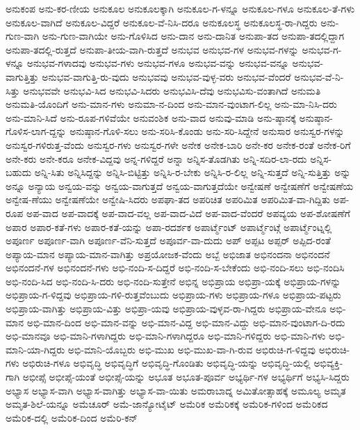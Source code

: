 {ಅನುಕಂಪ
ಅನು-ಕರ-ಣೀಯ
ಅನುಕೂಲ
ಅನುಕೂಲಕ್ಕಾಗಿ
ಅನುಕೂಲ-ಗ-ಳನ್ನೂ
ಅನುಕೂಲ-ಗಳೂ
ಅನುಕೂಲ-ತೆ-ಗಳು
ಅನುಕೂಲ-ವಾಗಿದೆ
ಅನುಕೂಲ-ವಿದ್ದರೆ
ಅನುಕೂಲ-ವೆ-ನಿಸಿ-ದರೂ
ಅನುಕೂಲಸ್ಥ
ಅನುಕೂಲಸ್ಥ-ರಾ-ಗಿದ್ದರು
ಅನು-ಗುಣ-ವಾಗಿ
ಅನು-ಗುಣ-ವಾಗಿಯೇ
ಅನು-ಗೊಳಿಸಿದ
ಅನು-ದಾನ
ಅನು-ದಾನಿತ
ಅನುಪಾ-ತದ
ಅನುಪಾ-ತದಲ್ಲಿದ್ದಾಗ
ಅನುಪಾ-ತದಲ್ಲಿ-ರುತ್ತದೆ
ಅನುಪಾ-ತೀಯ-ವಾಗಿ-ರುತ್ತದೆ
ಅನುಭವ
ಅನುಭವ-ಗಳ
ಅನುಭವ-ಗಳನ್ನು
ಅನುಭವ-ಗ-ಳನ್ನೂ
ಅನುಭವ-ಗಳಾದವು
ಅನುಭವ-ಗಳು
ಅನುಭವ-ಗಳೂ
ಅನುಭವ-ವನ್ನು
ಅನುಭವ-ವನ್ನೂ
ಅನುಭವ-ವಾಗುತ್ತಿತ್ತು
ಅನುಭವ-ವಾಗುತ್ತಿ-ರು-ವುದು
ಅನುಭವವು
ಅನುಭವ-ವುಳ್ಳ-ವರು
ಅನುಭವ-ವೆಂದರೆ
ಅನುಭವ-ವೆ-ನಿ-ಸಿತ್ತು
ಅನುಭವವೇ
ಅನುಭವಿ-ಸಿದ
ಅನುಭವಿ-ಸಿದರು
ಅನುಭವಿಸಿ-ದೆವು
ಅನುಭವಿಸು-ವಂತಾಗಿದೆ
ಅನುಮತಿ
ಅನುಮತಿ-ಯೊಂದಿಗೆ
ಅನು-ಮಾನ-ಗಳು
ಅನುಮಾ-ನ-ದಿಂದ
ಅನು-ಮಾನ-ವುಂಟಾಗ-ಲಿಲ್ಲ
ಅನು-ಮಾ-ನಿಸಿ-ದರು
ಅನು-ಮಾನಿ-ಸಿದೆ
ಅನು-ರೂಪ-ಗಳಿವೆಯೇ
ಅನುವಂಶಿಕ
ಅನು-ವಾದ
ಅನುವು-ಮಾಡಿ
ಅನು-ಷ್ಠಾನಕ್ಕೆ
ಅನುಷ್ಠಾನ-ಗೊಳಿಸ-ಲಾಗ-ದ್ದನ್ನು
ಅನುಷ್ಠಾನ-ಗೊಳಿ-ಸಲು
ಅನು-ಸರಿಸಿ-ಕೊಂಡು
ಅನು-ಸರಿ-ಸಿದ್ದೇನೆ
ಅನುಸಾರ
ಅನುಸ್ವರ-ಗಳನ್ನು
ಅನುಸ್ವರ-ಗಳಿರುತ್ತ-ವೆಂದು
ಅನುಸ್ವರ-ಗಳು
ಅನುಸ್ವರ-ಗಳೇ
ಅನೇಕ
ಅನೇಕ-ಬಾರಿ
ಅನೇ-ಕರ
ಅನೇಕ-ರಂತೆ
ಅನೇಕ-ರಿಗೆ
ಅನೇ-ಕರು
ಅನೇ-ಕರೂ
ಅನೇಕ-ವಿದ್ದವು
ಅನ್ನ-ಗಳಿದ್ದರೆ
ಅನ್ನಾ
ಅನ್ನಿಸ-ತೊಡಗಿತು
ಅನ್ನಿ-ಸದಿರ-ಲಾ-ರದು
ಅನ್ನಿಸ-ಬಹುದು
ಅನ್ನಿ-ಸಿತು
ಅನ್ನಿಸಿದ್ದನ್ನು
ಅನ್ನಿಸಿ-ಬಿಟ್ಟಿತ್ತು
ಅನ್ನಿಸಿ-ರ-ಬೇಕು
ಅನ್ನಿಸಿ-ರ-ಲಿಲ್ಲ
ಅನ್ನಿ-ಸುತ್ತದೆ
ಅನ್ನಿ-ಸುತ್ತಿತ್ತು
ಅನ್ನು
ಅನ್ನೂ
ಅನ್ಯಾಯ
ಅನ್ವಯ-ವನ್ನು
ಅನ್ವಯ-ವಾಗುತ್ತದೆ
ಅನ್ವಯ-ವಾಗುತ್ತದೆಯೇ
ಅನ್ವೇಷಣೆ
ಅನ್ವೇಷಣೆಗೆ
ಅನ್ವೇಷಣೆಯ
ಅನ್ವೇಷ-ಣೆಯು
ಅನ್ವೇಷಣೆಯೇ
ಅನ್ವೇಷಿ-ಸಿದರು
ಅಪಘಾ-ತದ
ಅಪರಿಚಿತ
ಅಪರಿಮಿತ
ಅಪರಿಮಿತ-ವಾ-ಗಿದ್ದಿತು
ಅಪ-ರೂಪ
ಅಪ-ವಾದ
ಅಪ-ವಾದಕ್ಕೆ
ಅಪ-ವಾದ-ವಲ್ಲ
ಅಪ-ವಾದ-ವಿದೆ
ಅಪ-ವಾದ-ವೆಂದರೆ
ಅಪವ್ಯಯ
ಅಪ-ಶೋಷಣೆಗೆ
ಅಪಾರ
ಅಪಾರ-ಕತೆ-ಗಳು
ಅಪಾರ-ಕತೆ-ಯನ್ನು
ಅಪಾ-ರದರ್ಶಕ
ಅಪಾರ್ಟ್ಮೆಂಟ್
ಅಪಾರ್ಟ್ಮೆಂಟ್ಗೆ
ಅಪಾರ್ಟ್ಮೆಂಟ್ನಲ್ಲಿ
ಅಪೂರ್ಣ
ಅಪೂರ್ಣ-ವಾಗಿ
ಅಪೂರ್ಣ-ವೆನಿ-ಸುತ್ತದೆ
ಅಪೂರ್ವ-ವಾ-ದುದು
ಅಪ್
ಅಪ್ಪಟ
ಅಪ್ಪರ್
ಅಪ್ಪಿದ-ರಂತೆ
ಅಪ್ಯಾಯ-ಮಾನ
ಅಪ್ಯಾಯ-ಮಾನ-ವಾಗಿತ್ತು
ಅಪ್ರಯೋಜಕ-ವೆಂದು
ಅಬ್ಬೆ
ಅಭಿಜಾತ
ಅಭಿನಂದನಾ
ಅಭಿನಂದನೆ
ಅಭಿನಂದನೆ-ಗಳ
ಅಭಿನಂದನೆ-ಗಳು
ಅಭಿ-ನಂದಿ-ಸ-ದಿದ್ದರೆ
ಅಭಿ-ನಂದಿ-ಸ-ಬೇಕೆಂದು
ಅಭಿ-ನಂದಿ-ಸಲು
ಅಭಿ-ನಂದಿಸಿ
ಅಭಿ-ನಂದಿ-ಸಿದ
ಅಭಿ-ನಂದಿ-ಸಿ-ದರು
ಅಭಿ-ನಂದಿ-ಸುತ್ತೇನೆ
ಅಭಿನ್ನ
ಅಭಿಪ್ರಾಯ
ಅಭಿಪ್ರಾ-ಯಕ್ಕೆ
ಅಭಿಪ್ರಾಯ-ಗಳನ್ನು
ಅಭಿಪ್ರಾಯ-ಗ-ಳಿದ್ದವು
ಅಭಿಪ್ರಾಯ-ಗಳಿ-ರುತ್ತವೆಂಬುದು
ಅಭಿಪ್ರಾಯ-ಗಳು
ಅಭಿಪ್ರಾಯ-ಗಳೂ
ಅಭಿಪ್ರಾಯ-ಪಟ್ಟರು
ಅಭಿಪ್ರಾಯ-ವಾಗಿತ್ತು
ಅಭಿಪ್ರಾಯ-ವಿತ್ತು
ಅಭಿಪ್ರಾ-ಯವು
ಅಭಿಪ್ರಾಯ-ವುಳ್ಳವ-ರಾ-ಗಿದ್ದರು
ಅಭಿಪ್ರಾಯ-ವೇನೂ
ಅಭಿ-ಮಾನ
ಅಭಿ-ಮಾನ-ದಿಂದ
ಅಭಿ-ಮಾನ-ವನ್ನು
ಅಭಿ-ಮಾನ-ವಿದ್ದ
ಅಭಿ-ಮಾನ-ವಿದ್ದು
ಅಭಿ-ಮಾನ-ವುಂಟಾಗ-ದಿ-ರದು
ಅಭಿ-ಮಾನವೂ
ಅಭಿ-ಮಾನಿ-ಗಳಾಗಿದ್ದರು
ಅಭಿ-ಮಾನಿ-ಗಳಾಗಿದ್ದರೂ
ಅಭಿ-ಮಾನಿ-ಗಳಿದ್ದರು
ಅಭಿ-ಮಾನಿ-ಗಳು
ಅಭಿ-ಮಾನಿ-ಯಾ-ಗಿದ್ದರು
ಅಭಿ-ಮಾನಿ-ಯೊಬ್ಬರು
ಅಭಿ-ಮುಖ
ಅಭಿ-ಮುಖ-ವಾ-ಗಿ-ರುವ
ಅಭಿರುಚಿ-ಗ-ಳಿದ್ದವು
ಅಭಿರುಚಿ-ಗಳು
ಅಭಿರುಚಿ-ಗಳೂ
ಅಭಿವೃದ್ಧಿ
ಅಭಿವೃದ್ಧಿಗೆ
ಅಭಿವೃದ್ಧಿ-ಗೊಂಡಿತು
ಅಭಿವೃದ್ಧಿ-ಯನ್ನು
ಅಭಿವೃದ್ಧಿ-ಯಲ್ಲಿ
ಅಭಿವ್ಯಕ್ತಿ-ಗಾಗಿ
ಅಭೀಪ್ಸೆ
ಅಭೀಪ್ಸೆ-ಯಂತೆ
ಅಭೀಪ್ಸೆ-ಯನ್ನು
ಅಭೂತ
ಅಭೂತ-ಪೂರ್ವ
ಅಭ್ಯರ್ಥಿ-ಗಳ
ಅಭ್ಯರ್ಥಿಗೆ
ಅಭ್ಯಸಿ-ಸಿದ್ದರು
ಅಭ್ಯಾಸ
ಅಭ್ಯಾಸ-ವಾಗಿ
ಅಭ್ಯಾಸ-ವಾಗಿತ್ತು
ಅಭ್ಯಾಸ-ವಾ-ಯಿತು
ಅಮರಾಬಾದ್ನ
ಅಮಿತೋತ್ಸಾಹಕ್ಕೆ
ಅಮೂಲ್ಯ
ಅಮೃತ
ಅಮೃತ-ಶಿಲೆ-ಯನ್ನೂ
ಅಮೆಚೂರ್
ಅಮೆ-ಜಾನ್ಯೋಟೈಟ್
ಅಮೆರಿಕ
ಅಮೆರಿಕಕ್ಕೆ
ಅಮೆರಿಕ-ಗಳಿಂದ
ಅಮೆರಿಕದ
ಅಮೆರಿಕ-ದಲ್ಲಿ
ಅಮೆರಿಕ-ದಿಂದ
ಅಮೆರಿ-ಕನ್
}
